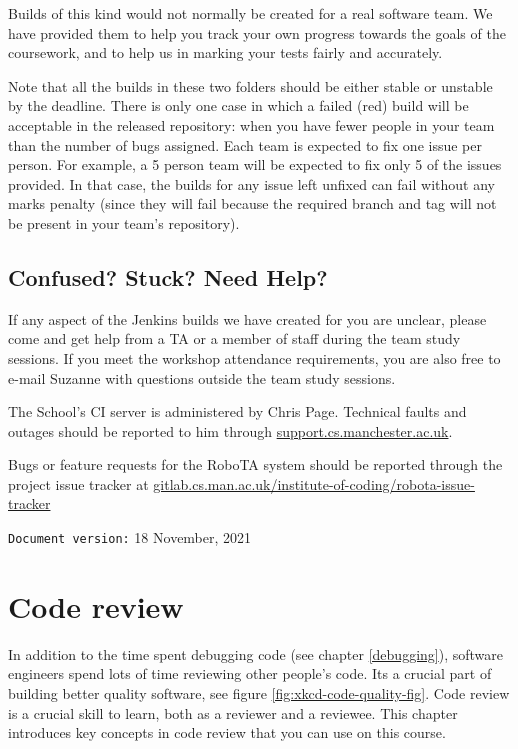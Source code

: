\documentclass[
]{book}
\begin{document}
Builds of this kind would not normally be created for a real software team. We have provided them to help you track your own progress towards the goals of the coursework, and to help us in marking your tests fairly and accurately.

Note that all the builds in these two folders should be either stable or unstable by the deadline. There is only one case in which a failed (red) build will be acceptable in the released repository: when you have fewer people in your team than the number of bugs assigned. Each team is expected to fix one issue per person. For example, a 5 person team will be expected to fix only 5 of the issues provided. In that case, the builds for any issue left unfixed can fail without any marks penalty (since they will fail because the required branch and tag will not be present in your team's repository).

\hypertarget{confused}{%
\section{Confused? Stuck? Need Help?}\label{confused}}

If any aspect of the Jenkins builds we have created for you are unclear, please come and get help from a TA or a member of staff during the team study sessions. If you meet the workshop attendance requirements, you are also free to e-mail Suzanne with questions outside the team study sessions.

The School's CI server is administered by Chris Page. Technical faults and outages should be reported to him through \href{https://support.cs.manchester.ac.uk}{support.cs.manchester.ac.uk}.

Bugs or feature requests for the RoboTA system should be reported through the project issue tracker at \href{https://gitlab.cs.man.ac.uk/institute-of-coding/robota-issue-tracker}{gitlab.cs.man.ac.uk/institute-of-coding/robota-issue-tracker}

\texttt{Document\ version:} 18 November, 2021

\hypertarget{reviewing}{%
\chapter{Code review}\label{reviewing}}

In addition to the time spent debugging code (see chapter \ref{debugging}), software engineers spend lots of time reviewing other people's code. Its a crucial part of building better quality software, see figure \ref{fig:xkcd-code-quality-fig}. Code review is a crucial skill to learn, both as a reviewer and a reviewee. This chapter introduces key concepts in code review that you can use on this course.
\end{document}
